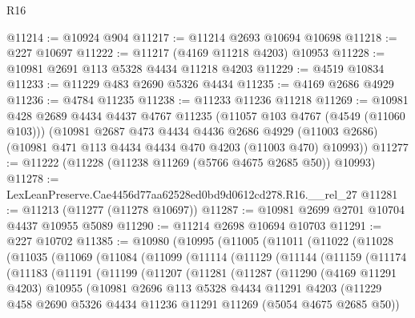 \begin{lexlean}{R16}
\begin{coremodule}
@11214 := @10924 @904
@11217 := @11214 @2693 @10694 @10698
@11218 := @227 @10697
@11222 := @11217 (@4169 @11218 @4203) @10953
@11228 := @10981 @2691 @113 @5328 @4434 @11218 @4203
@11229 := @4519 @10834
@11233 := @11229 @483 @2690 @5326 @4434
@11235 := @4169 @2686 @4929
@11236 := @4784 @11235
@11238 := @11233 @11236 @11218
@11269 := @10981
    @428
    @2689
    @4434
    @4437
    @4767
    @11235
    (@11057 @103 @4767 (@4549 (@11060 @103)))
    (@10981
      @2687
      @473
      @4434
      @4436
      @2686
      @4929
      (@11003 @2686)
      (@10981 @471 @113 @4434 @4434 @470 @4203 (@11003 @470) @10993))
@11277 := @11222 (@11228 (@11238 @11269 (@5766 @4675 @2685 @50)) @10993)
@11278 := LexLeanPreserve.Cae4456d77aa62528ed0bd9d0612cd278.R16.__rel_27
@11281 := @11213 (@11277 (@11278 @10697))
@11287 := @10981 @2699 @2701 @10704 @4437 @10955 @5089
@11290 := @11214 @2698 @10694 @10703
@11291 := @227 @10702
@11385 := @10980
    (@10995
      (@11005
        (@11011
          (@11022
            (@11028
              (@11035
                (@11069
                  (@11084
                    (@11099
                      (@11114
                        (@11129
                          (@11144
                            (@11159
                              (@11174
                                (@11183
                                  (@11191
                                    (@11199
                                      (@11207
                                        (@11281
                                          (@11287
                                            (@11290
                                              (@4169 @11291 @4203)
                                              @10955
                                              (@10981
                                                @2696
                                                @113
                                                @5328
                                                @4434
                                                @11291
                                                @4203
                                                (@11229
                                                  @458
                                                  @2690
                                                  @5326
                                                  @4434
                                                  @11236
                                                  @11291
                                                  @11269
                                                  (@5054 @4675 @2685 @50))

\end{coremodule}
\end{lexlean}
